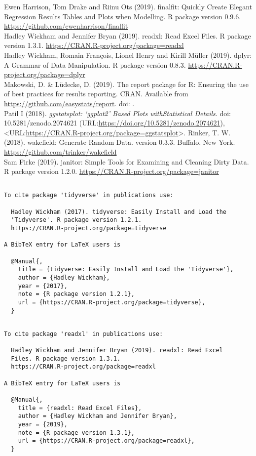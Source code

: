 \documentclass[]{article}
\begin{document}
Ewen Harrison, Tom Drake and Riinu Ots (2019). finalfit: Quickly Create
Elegant Regression Results Tables and Plots when Modelling. R package
version 0.9.6. \url{https://github.com/ewenharrison/finalfit}\\
Hadley Wickham and Jennifer Bryan (2019). readxl: Read Excel Files. R
package version 1.3.1. \url{https://CRAN.R-project.org/package=readxl}\\
Hadley Wickham, Romain François, Lionel Henry and Kirill Müller (2019).
dplyr: A Grammar of Data Manipulation. R package version 0.8.3.
\url{https://CRAN.R-project.org/package=dplyr}\\
Makowski, D. \& Lüdecke, D. (2019). The report package for R: Ensuring
the use of best practices for results reporting. CRAN. Available from
\url{https://github.com/easystats/report}. doi: .\\
Patil I (2018). \emph{ggstatsplot: `ggplot2' Based Plots withStatistical
Details}. doi: 10.5281/zenodo.2074621
(URL:\url{https://doi.org/10.5281/zenodo.2074621}),
\textless URL:\url{https://CRAN.R-project.org/package=ggstatsplot}\textgreater.
Rinker, T. W. (2018). wakefield: Generate Random Data. version 0.3.3.
Buffalo, New York. \url{https://github.com/trinker/wakefield}\\
Sam Firke (2019). janitor: Simple Tools for Examining and Cleaning Dirty
Data. R package version 1.2.0.
\url{https://CRAN.R-project.org/package=janitor}

\begin{verbatim}

To cite package 'tidyverse' in publications use:

  Hadley Wickham (2017). tidyverse: Easily Install and Load the
  'Tidyverse'. R package version 1.2.1.
  https://CRAN.R-project.org/package=tidyverse

A BibTeX entry for LaTeX users is

  @Manual{,
    title = {tidyverse: Easily Install and Load the 'Tidyverse'},
    author = {Hadley Wickham},
    year = {2017},
    note = {R package version 1.2.1},
    url = {https://CRAN.R-project.org/package=tidyverse},
  }
\end{verbatim}

\begin{verbatim}

To cite package 'readxl' in publications use:

  Hadley Wickham and Jennifer Bryan (2019). readxl: Read Excel
  Files. R package version 1.3.1.
  https://CRAN.R-project.org/package=readxl

A BibTeX entry for LaTeX users is

  @Manual{,
    title = {readxl: Read Excel Files},
    author = {Hadley Wickham and Jennifer Bryan},
    year = {2019},
    note = {R package version 1.3.1},
    url = {https://CRAN.R-project.org/package=readxl},
  }
\end{verbatim}
\end{document}
